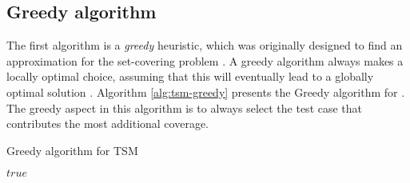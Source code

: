 
\subsection{Greedy algorithm}
The first algorithm is a \emph{greedy} heuristic, which was originally designed to find an approximation for the set-covering problem \cite{evaluationoftestsuiteminimization}. A greedy algorithm always makes a locally optimal choice, assuming that this will eventually lead to a globally optimal solution \cite{10.5555/1614191}. Algorithm \ref{alg:tsm-greedy} presents the Greedy algorithm for \tsm{}. The greedy aspect in this algorithm is to always select the test case that contributes the most additional coverage.

\begin{algorithm}
\caption{Greedy algorithm for TSM}
\label{alg:tsm-greedy}
\begin{algorithmic}[1]
	\State $true$
\end{algorithmic}
\end{algorithm}
